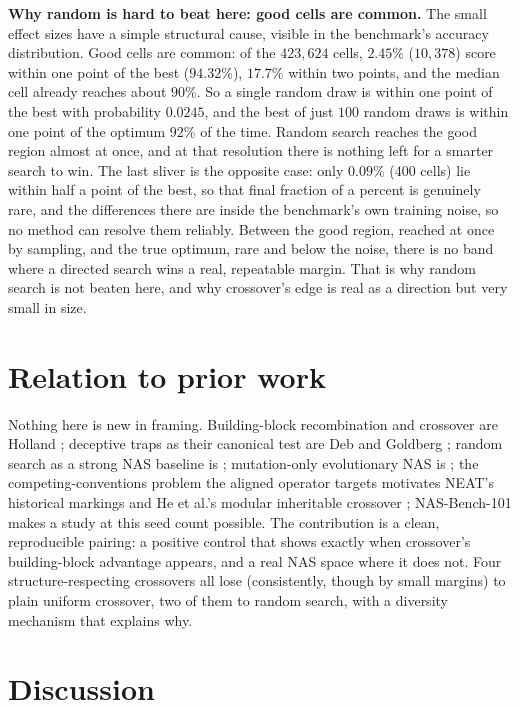 \documentclass[11pt]{article}
\begin{document}
\textbf{Why random is hard to beat here: good cells are common.} The small effect sizes have a
simple structural cause, visible in the benchmark's accuracy distribution. Good cells are
common: of the $423{,}624$ cells, $2.45\%$ ($10{,}378$) score within one point of the best
($94.32\%$), $17.7\%$ within two points, and the median cell already reaches about $90\%$. So a
single random draw is within one point of the best with probability $0.0245$, and the best of
just $100$ random draws is within one point of the optimum $92\%$ of the time. Random search
reaches the good region almost at once, and at that resolution there is nothing left for a
smarter search to win. The last sliver is the opposite case: only $0.09\%$ ($400$ cells) lie
within half a point of the best, so that final fraction of a percent is genuinely rare, and the
differences there are inside the benchmark's own training noise, so no method can resolve them
reliably. Between the good region, reached at once by sampling, and the true optimum, rare and
below the noise, there is no band where a directed search wins a real, repeatable margin. That
is why random search is not beaten here, and why crossover's edge is real as a direction but
very small in size.

\section{Relation to prior work}

Nothing here is new in framing. Building-block recombination and crossover are Holland
\cite{holland1975}; deceptive traps as their canonical test are Deb and Goldberg \cite{deb1993};
random search as a strong NAS baseline is \cite{bergstra2012,li2019}; mutation-only evolutionary
NAS is \cite{real2019}; the competing-conventions problem the aligned operator targets motivates
NEAT's historical markings \cite{neat2002} and He et al.'s modular inheritable crossover
\cite{modxover2021}; NAS-Bench-101 \cite{nasbench101} makes a study at this seed count possible.
The contribution is a clean, reproducible pairing: a positive control that shows exactly when
crossover's building-block advantage appears, and a real NAS space where it does not. Four
structure-respecting crossovers all lose (consistently, though by small margins) to plain
uniform crossover, two of them to random search, with a diversity mechanism that explains why.

\section{Discussion}
\end{document}
